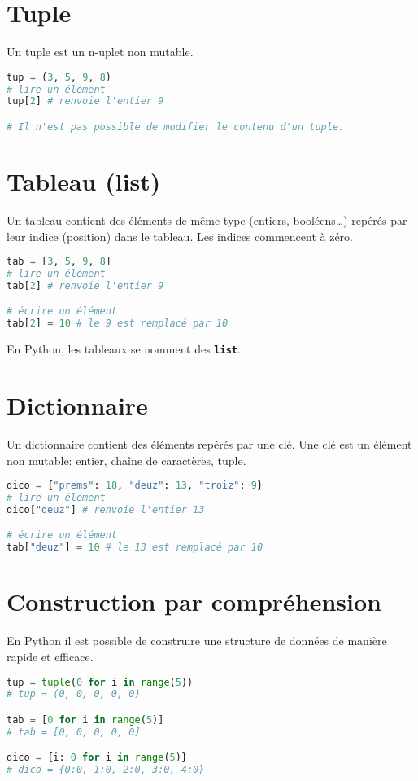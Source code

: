 \documentclass[a4paper,11pt]{article}
\begin{document}
\section{Tuple}
Un tuple est un n-uplet non mutable.
\begin{lstlisting}[language=Python  , xleftmargin=2em, xrightmargin=2em]
tup = (3, 5, 9, 8)
# lire un élément
tup[2] # renvoie l'entier 9

# Il n'est pas possible de modifier le contenu d'un tuple.
\end{lstlisting}
\section{Tableau (list)}
Un tableau contient des éléments de même type (entiers, booléens\dots) repérés par leur indice (position) dans le tableau. Les indices commencent à zéro.
\begin{lstlisting}[language=Python  , xleftmargin=2em, xrightmargin=2em]
tab = [3, 5, 9, 8]
# lire un élément
tab[2] # renvoie l'entier 9

# écrire un élément
tab[2] = 10 # le 9 est remplacé par 10
\end{lstlisting}
En Python, les tableaux se nomment des \textbf{\texttt{list}}.
\section{Dictionnaire}
Un dictionnaire contient des éléments repérés par une clé. Une clé est un élément non mutable: entier, chaîne de caractères, tuple.
\begin{lstlisting}[language=Python  , xleftmargin=2em, xrightmargin=2em]
dico = {"prems": 18, "deuz": 13, "troiz": 9}
# lire un élément
dico["deuz"] # renvoie l'entier 13

# écrire un élément
tab["deuz"] = 10 # le 13 est remplacé par 10
\end{lstlisting}

\section{Construction par compréhension}
En Python il est possible de construire une structure de données de manière rapide et efficace.
\begin{center}
    \begin{lstlisting}[language=Python  , xleftmargin=2em, xrightmargin=2em]
tup = tuple(0 for i in range(5))
# tup = (0, 0, 0, 0, 0)

tab = [0 for i in range(5)]
# tab = [0, 0, 0, 0, 0]

dico = {i: 0 for i in range(5)}
# dico = {0:0, 1:0, 2:0, 3:0, 4:0}
\end{lstlisting}
    \label{CODE}
\end{center}
\end{document}
